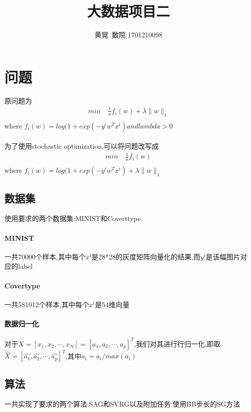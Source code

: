 \documentclass[UTF8]{ctexart}
\author{黄晃\ 数院 1701210098 }
\title{大数据项目二}
\begin{document}
  \maketitle
  \section{问题}
  原问题为
  \begin{equation}\label{p:1}
    \begin{split}
       min\  &  \frac{1}{n}f_i(w)+\lambda\|w\|_1 \\
    \end{split}
  \end{equation}
  where $f_i(w)=log(1+exp(-y^iw^Tx^i)and lambda>0$
  \paragraph{}
  为了使用stochastic optimization,可以将问题改写成
    \begin{equation}\label{p:2}
    \begin{split}
       min\  &  \frac{1}{n}f_i(w)\\
    \end{split}
  \end{equation}
  where $f_i(w)=log(1+exp(-y^iw^Tx^i)+\lambda\|w\|_1$
  \subsection{数据集}
    使用要求的两个数据集:MINIST和Coverttype.
    \paragraph{MINIST}
    一共70000个样本,其中每个$x^i$是28*28的灰度矩阵向量化的结果,而$y^i$是该幅图片对应的label
    \paragraph{Covertype}
    一共581012个样本,其中每个$x^i$是54维向量
    \paragraph{数据归一化}
    对于$X=[x_1,x_2,\cdots,x_N]=[a_1,a_2,\cdots,a_p]^T$,我们对其进行行归一化,即取$\hat{X}=[\hat{a_1},\hat{a_2},\cdots,\hat{a_p}]^T$,其中$\hat{a_i}=a_i/max(a_i)$
    \subsection{算法}
  一共实现了要求的两个算法:SAG和SVRG以及附加任务:使用BB步长的SG方法
\end{document}
